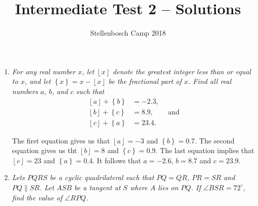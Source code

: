 \documentclass{article}
\title{Intermediate Test 2 -- Solutions}
\author{Stellenbosch Camp 2018}
\date{\vspace{-12pt}}
\newcommand{\floor}[1]{\ensuremath{\left\lfloor#1\right\rfloor}}
\newcommand{\fracpart}[1]{\ensuremath{\left\{#1\right\}}}
\def\deg{^{\circ}}
\begin{document}
\maketitle

\begin{enumerate}

\item %
\textit{For any real number $x$, let $\floor{x}$ denote the greatest integer less than or equal to $x$, and let $\fracpart{x} = x -\floor{x}$ be the fractional part of $x$. Find all real numbers $a$, $b$, and $c$ such that
\begin{align*}
  \floor{a} +\fracpart{b} &= -2.3, \\
  \floor{b} +\fracpart{c} &= 8.9, \qquad \mathrm{and}\\
  \floor{c} +\fracpart{a} &= 23.4.
\end{align*}}

The first equation gives us that $\floor{a} = -3$ and $\fracpart{b} = 0.7$. The second equation gives us tht $\floor{b} = 8$ and $\fracpart{c} = 0.9$. The last equation implies that $\floor{c} = 23$ and $\fracpart{a} = 0.4$. It follows that $a = -2.6$, $b = 8.7$ and $c = 23.9$.


\vspace{12pt}
\item %
\textit{Lets $PQRS$ be a cyclic quadrilateral such that $PQ = QR$, $PR = SR$ and $PQ \parallel SR$. Let $ASB$ be a tangent at $S$ where $A$ lies on $PQ$. If $\angle BSR = 72^{\circ}$, find the value of $\angle RPQ$.}

\begin{figure}[H]
\begin{center}
\end{center}		
\end{figure}


\end{enumerate}
\end{document}

